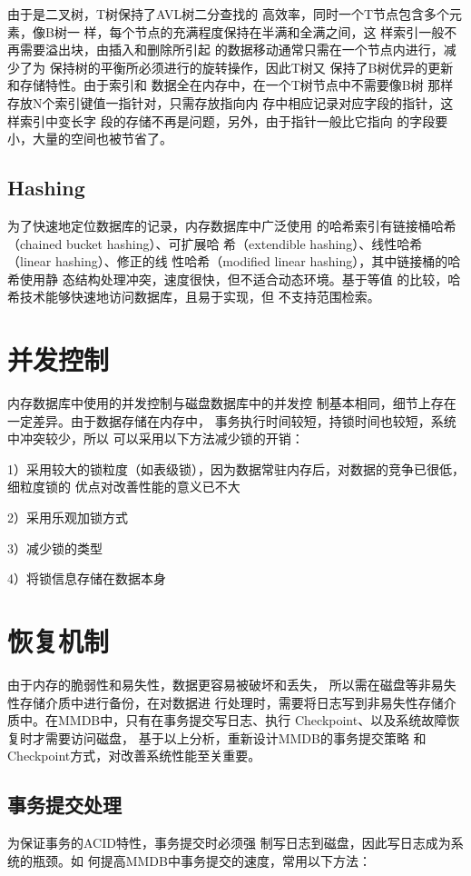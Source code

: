\documentclass[literaturereview]{zjutreport}
\begin{document}
由于是二叉树，T树保持了AVL树二分查找的
高效率，同时一个T节点包含多个元素，像B树一
样，每个节点的充满程度保持在半满和全满之间，这
样索引一般不再需要溢出块，由插入和删除所引起
的数据移动通常只需在一个节点内进行，减少了为
保持树的平衡所必须进行的旋转操作，因此T树又
保持了B树优异的更新和存储特性。由于索引和
数据全在内存中，在一个T树节点中不需要像B树
那样存放N个索引键值一指针对，只需存放指向内
存中相应记录对应字段的指针，这样索引中变长字
段的存储不再是问题，另外，由于指针一般比它指向
的字段要小，大量的空间也被节省了。

\subsection{Hashing}
为了快速地定位数据库的记录，内存数据库中广泛使用
的哈希索引有链接桶哈希（chained bucket hashing）、可扩展哈
希（extendible hashing）、线性哈希（linear hashing）、修正的线
性哈希（modified linear hashing），其中链接桶的哈希使用静
态结构处理冲突，速度很快，但不适合动态环境。基于等值
的比较，哈希技术能够快速地访问数据库，且易于实现，但
不支持范围检索。

\section{并发控制}
内存数据库中使用的并发控制与磁盘数据库中的并发控
制基本相同，细节上存在一定差异。由于数据存储在内存中，
事务执行时间较短，持锁时间也较短，系统中冲突较少，所以
可以采用以下方法减少锁的开销：

1）采用较大的锁粒度（如表级锁），因为数据常驻内存后，对数据的竞争已很低，细粒度锁的
优点对改善性能的意义已不大

2）采用乐观加锁方式

3）减少锁的类型

4）将锁信息存储在数据本身

\section{恢复机制}
由于内存的脆弱性和易失性，数据更容易被破坏和丢失，
所以需在磁盘等非易失性存储介质中进行备份，在对数据进
行处理时，需要将日志写到非易失性存储介质中。在MMDB中，只有在事务提交写日志、执行
Checkpoint、以及系统故障恢复时才需要访问磁盘，
基于以上分析，重新设计MMDB的事务提交策略
和Checkpoint方式，对改善系统性能至关重要。

\subsection{事务提交处理}
为保证事务的ACID特性，事务提交时必须强
制写日志到磁盘，因此写日志成为系统的瓶颈。如
何提高MMDB中事务提交的速度，常用以下方法：
\end{document}
